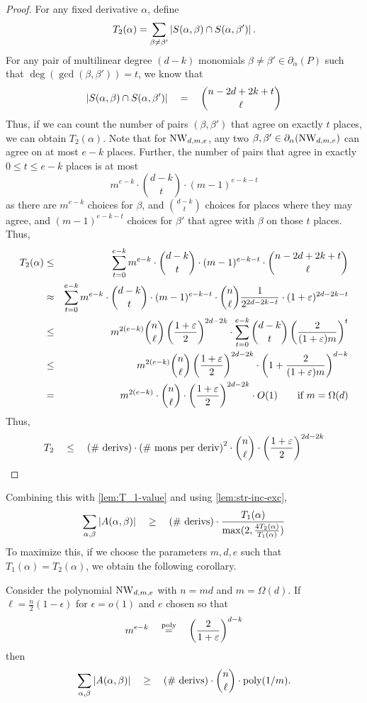 \begin{proof}
For any fixed derivative $\alpha$, define \[T_2(\alpha) = \sum_{\beta\neq \beta'}\left|S(\alpha, \beta)\cap S(\alpha, \beta')\right|.\] 
For any pair of multilinear degree $(d-k)$ monomials $\beta \neq \beta' \in \partial_\alpha(P)$ such that $\deg(\gcd(\beta, \beta')) = t$, we know that 
\[
\left|S(\alpha, \beta)\cap S(\alpha, \beta')\right| \quad = \quad \binom{n - 2d + 2k +t}{\ell}
\]
Thus, if we can count the number of pairs $(\beta, \beta')$ that agree on exactly $t$ places, we can obtain $T_2(\alpha)$. 
Note that for $\mathrm{NW}_{d,m,e}$, any two $\beta, \beta' \in\partial_\alpha(\mathrm{NW}_{d,m,e})$ can agree on at most $e-k$ places. 
Further, the number of pairs that agree in exactly $0\leq t\leq e-k$ places is at most
\[
m^{e-k} \cdot \binom{d-k}{t} \cdot (m-1)^{e-k-t}
\]
as there are $m^{e-k}$ choices for $\beta$, and $\binom{d-k}{t}$ choices for places where they may agree, and $(m-1)^{e-k-t}$ choices for $\beta'$ that agree with $\beta$ on those $t$ places. 
Thus,
\begin{eqnarray*}
T_2(\alpha) &\leq& \sum_{t=0}^{e-k} m^{e-k} \cdot \binom{d-k}{t} \cdot (m-1)^{e-k-t} \cdot  \binom{n - 2d + 2k +t}{\ell}\\
& \approx  & \sum_{t=0}^{e-k} m^{e-k} \cdot \binom{d-k}{t} \cdot (m-1)^{e-k-t} \cdot  \binom{n}{\ell} \frac{1}{2^{2d-2k -t}}\cdot (1+\varepsilon)^{2d - 2k - t}\\
& \leq & m^{2(e-k)}\binom{n}{\ell}\left(\frac{1+\varepsilon}{2}\right)^{2d -2k}\cdot\sum_{t=0}^{e-k}\binom{d-k}{t}\left(\frac{2}{(1+\varepsilon)m}\right)^t\\
& \leq & m^{2(e-k)}\binom{n}{\ell}\left(\frac{1+\varepsilon}{2}\right)^{2d -2k}\cdot \left(1+\frac{2}{(1+\varepsilon)m}\right)^{d-k}\\
& = & m^{2(e-k)}\cdot \binom{n}{\ell} \cdot \left(\frac{1+\varepsilon}{2}\right)^{2d -2k}\cdot O(1) \qquad\text{if $m = \Omega(d)$}
\end{eqnarray*}
Thus,
\[
T_2 \quad \leq \quad\text{(\# derivs)} \cdot \text{(\# mons per deriv)}^2\cdot \binom{n}{\ell} \cdot \left(\frac{1+\varepsilon}{2}\right)^{2d -2k}
\]
\end{proof}
Combining this with \autoref{lem:T_1-value} and using \autoref{lem:str-inc-exc},
\[
\sum_{\alpha,\beta}\left|A(\alpha, \beta)\right| \quad \geq \quad \text{(\# derivs)}\cdot \frac{T_1(\alpha)}{\max(2, \frac{4T_2(\alpha)}{T_1(\alpha)})}
\]
To maximize this, if we choose the parameters $m,d,e$ such that $T_1(\alpha) = T_2(\alpha)$, we obtain the following corollary. 
\begin{corollary}\label{cor:T2-bound}
Consider the polynomial $\mathrm{NW}_{d,m,e}$ with $n = md$ and $m = \Omega(d)$. 
If $\ell = \frac{n}{2}(1 - \epsilon)$ for $\epsilon = o(1)$ and $e$ chosen so that
\[
m^{e-k} \quad \stackrel{\mathrm{poly}}{=} \quad \left(\frac{2}{1+\varepsilon}\right)^{d-k}
\]
then
\[
\sum_{\alpha, \beta}\left|A(\alpha, \beta)\right| \quad \geq \quad \text{(\# derivs)}\cdot  \binom{n}{\ell} \cdot \mathrm{poly}(1/m).
\]
\end{corollary}
